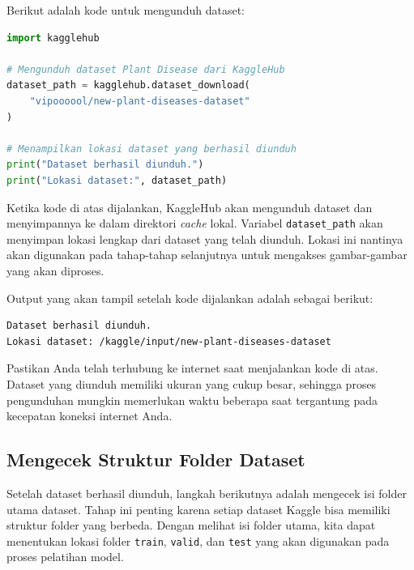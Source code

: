 Berikut adalah kode untuk mengunduh dataset:

\begin{lstlisting}[language=Python, caption=Mengunduh dataset dari KaggleHub]
import kagglehub

# Mengunduh dataset Plant Disease dari KaggleHub
dataset_path = kagglehub.dataset_download(
    "vipoooool/new-plant-diseases-dataset"
)

# Menampilkan lokasi dataset yang berhasil diunduh
print("Dataset berhasil diunduh.")
print("Lokasi dataset:", dataset_path)
\end{lstlisting}

Ketika kode di atas dijalankan, KaggleHub akan mengunduh dataset dan menyimpannya ke dalam direktori \textit{cache} lokal. Variabel \texttt{dataset\_path} akan menyimpan lokasi lengkap dari dataset yang telah diunduh. Lokasi ini nantinya akan digunakan pada tahap-tahap selanjutnya untuk mengakses gambar-gambar yang akan diproses.

Output yang akan tampil setelah kode dijalankan adalah sebagai berikut:

\begin{outputcode}[H]
\begin{lstlisting}[language={}]
Dataset berhasil diunduh.
Lokasi dataset: /kaggle/input/new-plant-diseases-dataset
\end{lstlisting}
\caption{Output pengunduhan dataset}
\end{outputcode}

\begin{tcolorbox}[title=Catatan Penting, colback=blue!5!white, colframe=blue!70!black]
Pastikan Anda telah terhubung ke internet saat menjalankan kode di atas. Dataset yang diunduh memiliki ukuran yang cukup besar, sehingga proses pengunduhan mungkin memerlukan waktu beberapa saat tergantung pada kecepatan koneksi internet Anda.
\end{tcolorbox}

\subsection{Mengecek Struktur Folder Dataset}

Setelah dataset berhasil diunduh, langkah berikutnya adalah mengecek isi folder utama dataset. Tahap ini penting karena setiap dataset Kaggle bisa memiliki struktur folder yang berbeda. Dengan melihat isi folder utama, kita dapat menentukan lokasi folder \texttt{train}, \texttt{valid}, dan \texttt{test} yang akan digunakan pada proses pelatihan model.

